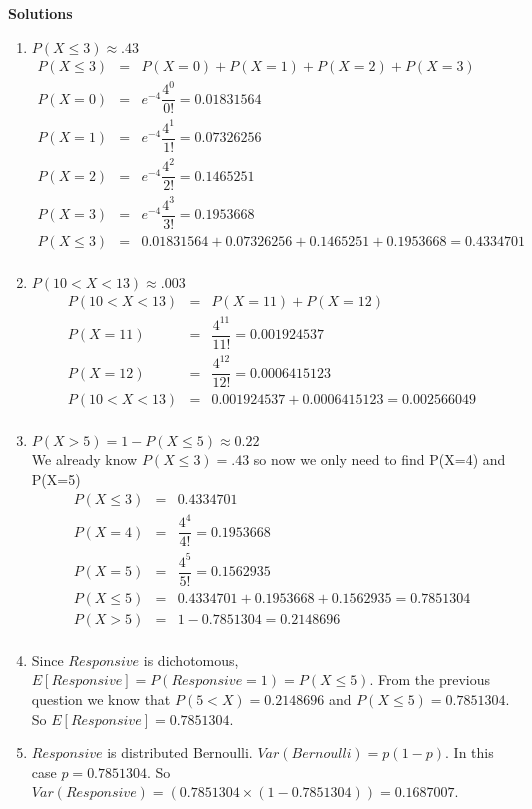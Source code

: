 \documentclass[11pt]{article}
\begin{document}
\textbf{Solutions}
\begin{enumerate}
\item
	$P(X \le 3) \approx .43$
	\begin{eqnarray*}
	P(X \le 3) &=& P(X=0) + P(X=1) + P(X=2) + P(X=3)\\
	P(X=0) &=& e^{-4} \dfrac{4^0}{0!} = 0.01831564\\
	P(X=1) &=& e^{-4} \dfrac{4^1}{1!} =  0.07326256\\
	P(X=2) &=& e^{-4} \dfrac{4^2}{2!} = 0.1465251\\
	P(X=3) &=& e^{-4} \dfrac{4^3}{3!} = 0.1953668 \\
	P(X \le 3) &=&  0.01831564 +  0.07326256 + 0.1465251 + 0.1953668 = 0.4334701\\
	\end{eqnarray*}

\item  $P( 10 <  X < 13) \approx .003$
	\begin{eqnarray*}
	P( 10 < X < 13) &=& P(X=11) + P(X=12)\\
	P(X=11) &=& \dfrac{4^{11}}{11!} = 0.001924537\\
	P(X=12) &=& \dfrac{4^{12}}{12!} =  0.0006415123\\
	P( 10 < X < 13) &=& 0.001924537 + 0.0006415123 = 0.002566049\\
	\end{eqnarray*}
	
\item $P(X > 5) = 1 - P(X \le 5) \approx  0.22$\\
We already know $P(X \le 3) =  .43$ so now we only need to find P(X=4) and P(X=5)
\begin{eqnarray*}
P(X \le 3) &=& 0.4334701\\
P(X = 4) &=& \dfrac{4^{4}}{4!} = 0.1953668 \\
P(X = 5) &=&  \dfrac{4^{5}}{5!} = 0.1562935 \\
P( X \le 5) &=&  0.4334701 + 0.1953668 + 0.1562935 = 0.7851304\\
P (X > 5) &=& 1 - 0.7851304 =  0.2148696\\
\end{eqnarray*}

\item
Since $Responsive$ is dichotomous, $E[Responsive] = P(Responsive=1) = P(X \le 5)$. From the previous question we know that $P(5 < X) =  0.2148696$ and $P(X \le 5) = 0.7851304$. So $E[Responsive] = 0.7851304$. 

\item $Responsive$ is distributed Bernoulli. $Var(Bernoulli) = p(1-p)$.  In this case $p=0.7851304$. So $Var(Responsive) = ( 0.7851304 \times (1-0.7851304) ) = 0.1687007$. 

\end{enumerate}
\end{document}
